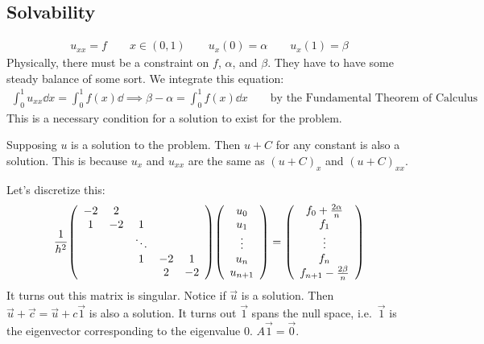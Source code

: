 \documentclass{article}
\begin{document}
        \subsection{Solvability}
            \begin{align}
                u_{xx} = f \qquad x \in (0,1) \qquad u_x(0) = \alpha \qquad u_x(1) = \beta
            \end{align}
            Physically, there must be a constraint on $f$, $\alpha$, and $\beta$.  They have to have some steady balance of some sort.  We integrate this equation:
            \begin{align}
                \int_0^1 u_{xx}\dd x = \int_0^1f(x) \dd \implies \boxed{\beta - \alpha = \int_0^1 f(x) \dd x} \qquad \text{by the Fundamental Theorem of Calculus}
            \end{align}
            This is a necessary condition for a solution to exist for the problem.

            Supposing $u$ is a solution to the problem.  Then $u + C$ for any constant is also a solution.  This is because $u_x$ and $u_{xx}$ are the same as $(u + C)_x$ and $(u + C)_{xx}$.

            Let's discretize this:
            \begin{align}
                \frac{1}{h^2}\qty(\begin{array}{ccccc}
                    -2 & 2 & & & \\
                    1 & -2 & 1 & & \\
                    & & \ddots & &  \\
                    & & 1 & -2 & 1 \\
                    & & & 2 & -2
                \end{array})\qty(\begin{array}{c}
                    u_0 \\ u_1 \\ \vdots \\ u_n \\ u_{n+1}
                \end{array}) = \qty(\begin{array}{c}
                    f_0 + \frac{2\alpha}{n} \\ f_1 \\ \vdots \\ f_n \\ f_{n+1} - \frac{2\beta}{n}
                \end{array})
            \end{align}
            It turns out this matrix is singular.  Notice if $\vec{u}$ is a solution.  Then $\vec{u} + \vec{c} = \vec{u} + c\vec{1}$ is also a solution.  It turns out $\vec{1}$ spans the null space, i.e.~$\vec{1}$ is the eigenvector corresponding to the eigenvalue $0$.  $A\vec{1} = \vec{0}$.
\end{document}
